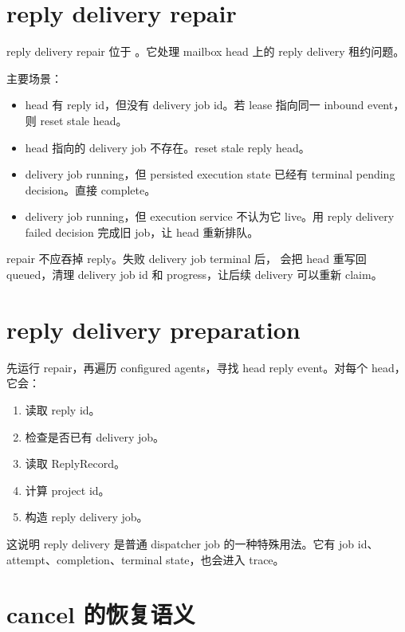 \section{reply delivery repair}

reply delivery repair 位于 。它处理 mailbox head 上的 reply delivery 租约问题。

主要场景：

\begin{itemize}
  \item head 有 reply id，但没有 delivery job id。若 lease 指向同一 inbound event，则 reset stale head。
  \item head 指向的 delivery job 不存在。reset stale reply head。
  \item delivery job running，但 persisted execution state 已经有 terminal pending decision。直接 complete。
  \item delivery job running，但 execution service 不认为它 live。用 reply delivery failed decision 完成旧 job，让 head 重新排队。
\end{itemize}

repair 不应吞掉 reply。失败 delivery job terminal 后， 会把 head 重写回 queued，清理 delivery job id 和 progress，让后续 delivery 可以重新 claim。

\section{reply delivery preparation}

 先运行 repair，再遍历 configured agents，寻找 head reply event。对每个 head，它会：

\begin{enumerate}
  \item 读取 reply id。
  \item 检查是否已有 delivery job。
  \item 读取 ReplyRecord。
  \item 计算 project id。
  \item 构造 reply delivery job。
\end{enumerate}

这说明 reply delivery 是普通 dispatcher job 的一种特殊用法。它有 job id、attempt、completion、terminal state，也会进入 trace。

\section{cancel 的恢复语义}

